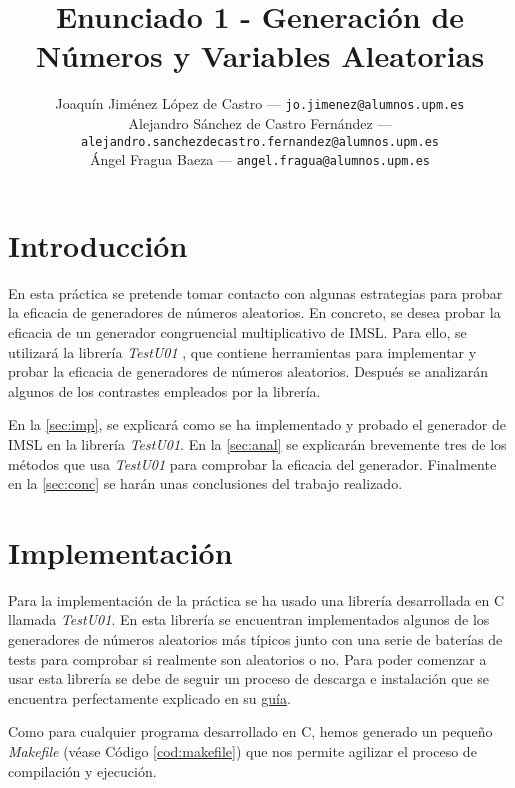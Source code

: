 \documentclass{article}
\title{Enunciado 1 - Generación de Números y Variables Aleatorias} %
\author{
        \normalsize Joaquín Jiménez López de Castro --- \texttt{jo.jimenez@alumnos.upm.es}\\
        \normalsize Alejandro Sánchez de Castro Fernández --- \texttt{alejandro.sanchezdecastro.fernandez@alumnos.upm.es}\\
        \normalsize Ángel Fragua Baeza --- \texttt{angel.fragua@alumnos.upm.es}
}
\begin{document}
\maketitle

\thispagestyle{empty}

\newpage


\section{Introducción}

En esta práctica se pretende tomar contacto con algunas estrategias para probar la eficacia de generadores de números aleatorios. En concreto, se desea probar la eficacia de un generador congruencial multiplicativo de IMSL. Para ello, se utilizará la librería \emph{TestU01} \citep{Simard2013ASL}, que contiene herramientas para implementar y probar la eficacia de generadores de números aleatorios. Después se analizarán algunos de los contrastes empleados por la librería.

En la \autoref{sec:imp}, se explicará como se ha implementado y probado el generador de IMSL en la librería \emph{TestU01}. En la \autoref{sec:anal} se explicarán brevemente tres de los métodos que usa \emph{TestU01} para comprobar la eficacia del generador. Finalmente en la \autoref{sec:conc} se harán unas conclusiones del trabajo realizado.

\section{Implementación}
\label{sec:imp}

Para la implementación de la práctica se ha usado una librería desarrollada en C llamada \emph{TestU01}. En esta librería se encuentran implementados algunos de los generadores de números aleatorios más típicos junto con una serie de baterías de tests para comprobar si realmente son aleatorios o no.
Para poder comenzar a usar esta librería se debe de seguir un proceso de descarga e instalación que se encuentra perfectamente explicado en su \href{http://simul.iro.umontreal.ca/testu01/install.html}{guía}.

Como para cualquier programa desarrollado en C, hemos generado un pequeño \emph{Makefile} (véase Código \ref{cod:makefile}) que nos permite agilizar el proceso de compilación y ejecución.
\end{document}
